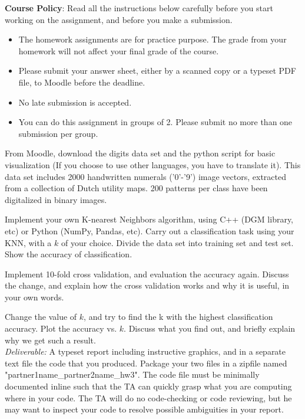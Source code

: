 \documentclass[a4 paper]{article}
\begin{document}
\textbf{Course Policy}: Read all the instructions below carefully before you start working on the assignment, and before you make a submission.
\begin{itemize}
    \item The homework assignments are for practice purpose. The grade from your homework will not affect your final grade of the course.
    \item Please submit your answer sheet, either by a scanned copy or a typeset PDF file, to Moodle before the deadline.
    \item No late submission is accepted.
    \item You can do this assignment in groups of 2. Please submit no more than one submission per group.
\end{itemize}

From Moodle, download the digits data set and the python script for basic visualization (If you choose to use other languages, you have to translate it). This data set includes 2000 handwritten numerals ('0'-'9') image vectors, extracted from a collection of Dutch utility maps. 200 patterns per class have been digitalized in binary images.

 Implement your own K-nearest Neighbors algorithm, using C++ (DGM library, etc) or Python (NumPy, Pandas, etc). Carry out a classification task using your KNN, with a $k$ of your choice. Divide the data set into training set and test set. Show the accuracy of classification.

 Implement 10-fold cross validation, and evaluation the accuracy again. Discuss the change, and explain how the cross validation works and why it is useful, in your own words.

 Change the value of $k$, and try to find the k with the highest classification accuracy. Plot the accuracy vs. $k$. Discuss what you find out, and briefly explain why we get such a result.\\

\textit{Deliverable:} A typeset report including instructive graphics, and in a separate text file the code that you produced. Package your two files in a zipfile named "partner1name\_partner2name\_hw3". The code file must be minimally documented inline such that the TA can quickly grasp what you are computing where in your code. The TA will do no code-checking or code reviewing, but he may want to inspect your code to resolve possible ambiguities in your report.
\end{document}
